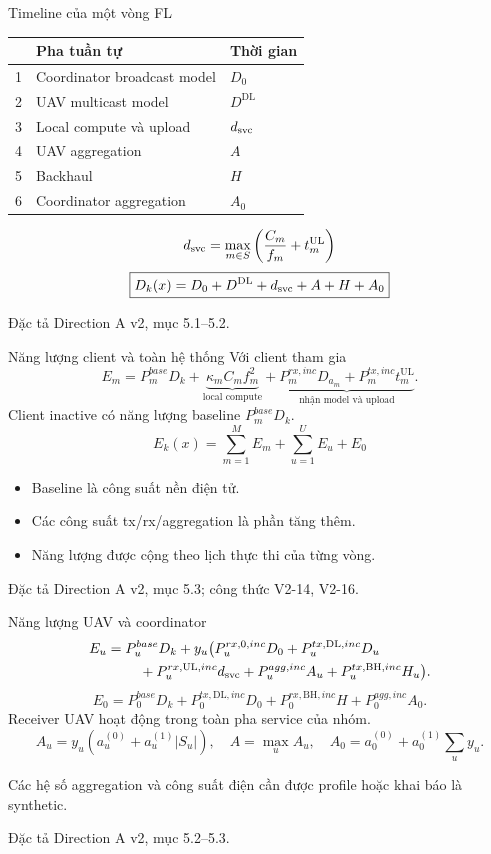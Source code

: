 \documentclass[10pt,aspectratio=43]{beamer}
\newcommand{\src}[1]{\par\vfill{\fontsize{6}{7.2}\selectfont\color{Muted}
 Đặc tả Direction A v2, mục #1.\par}}
\newcommand{\smallnote}[1]{\par{\footnotesize\color{Muted}#1\par}}
\newcommand{\UL}{\mathrm{UL}}
\newcommand{\DL}{\mathrm{DL}}
\newcommand{\BH}{\mathrm{BH}}
\begin{document}
\begin{frame}[t]{Timeline của một vòng FL}
\relax
\renewcommand{\arraystretch}{1.25}
\begin{tabularx}{.99\textwidth}{@{}cYl@{}}
\toprule
 & \textbf{Pha tuần tự} & \textbf{Thời gian}\\
 & Coordinator broadcast model & $D_0$\\
2 & UAV multicast model & $D^{\DL}$\\
3 & Local compute và upload & $d_{\rm svc}$\\
4 & UAV aggregation & $A$\\
5 & Backhaul & $H$\\
6 & Coordinator aggregation & $A_0$\\
\bottomrule
\end{tabularx}\par
\[
d_{\rm svc}=\max_{m\in S}\left(\frac{C_m}{f_m}+t_m^{\UL}\right)
\]
\[
\boxed{D_k(x)=D_0+D^{\DL}+d_{\rm svc}+A+H+A_0}
\]
\src{5.1--5.2}
\end{frame}

\begin{frame}[t]{Năng lượng client và toàn hệ thống}
\relax
Với client tham gia
\[
E_m=P_m^{base}D_k+
\underbrace{\kappa_m C_m f_m^2}_{\text{local compute}}+
\underbrace{P_m^{rx,inc}D_{a_m}
+P_m^{tx,inc}t_m^{\UL}}_{\text{nhận model và upload}}.
\]
Client inactive có năng lượng baseline $P_m^{base}D_k$.
\medskip
\[
\boxed{E_k(x)=\sum_{m=1}^M E_m+\sum_{u=1}^U E_u+E_0}
\]
\begin{itemize}
\item Baseline là công suất nền điện tử.
\item Các công suất tx/rx/aggregation là phần tăng thêm.
\item Năng lượng được cộng theo lịch thực thi của từng vòng.
\end{itemize}
\src{5.3; công thức V2-14, V2-16}
\end{frame}

\begin{frame}[t]{Năng lượng UAV và coordinator}
\relax
{\small
\[
\begin{aligned}
E_u={}&P_u^{base}D_k+y_u\big(
P_u^{rx,0,inc}D_0+P_u^{tx,\DL,inc}D_u\\
&\quad+P_u^{rx,\UL,inc}d_{\rm svc}
+P_u^{agg,inc}A_u+P_u^{tx,\BH,inc}H_u\big).
\end{aligned}
\]
\[
E_0=P_0^{base}D_k+P_0^{tx,\DL,inc}D_0
+P_0^{rx,\BH,inc}H+P_0^{agg,inc}A_0.
\]
}
\medskip
Receiver UAV hoạt động trong toàn pha service của nhóm.
\[
A_u=y_u(a_u^{(0)}+a_u^{(1)}|S_u|),\quad
A=\max_u A_u,\quad
A_0=a_0^{(0)}+a_0^{(1)}\sum_u y_u.
\]
\smallnote{Các hệ số aggregation và công suất điện cần được profile hoặc khai báo là synthetic.}
\src{5.2--5.3}
\end{frame}
\end{document}
